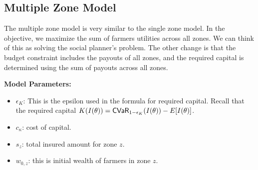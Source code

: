\documentclass[12pt]{article}
\begin{document}
\subsection{Multiple Zone Model}
The multiple zone model is very similar to the single zone model. In the objective, we maximize the sum of farmers utilities across all zones. We can think of this as solving the social planner's problem. The other change is that the budget constraint includes the payouts of all zones, and the required capital is determined using the sum of payouts across all zones.

\noindent\textbf{Model Parameters:}
\begin{itemize}
  \item $\epsilon_K$: This is the epsilon used in the formula for required capital. Recall that the required capital $K(I(\theta)) = {\sf CVaR}_{1-\epsilon_K}(I(\theta)) - E[I(\theta)]$. 
  \item $c_{\kappa}$: cost of capital. 
  \item $s_z$: total insured amount for zone $z$.
  \item $w_{0,z}$: this is initial wealth of farmers in zone $z$.
\end{itemize}
\end{document}
